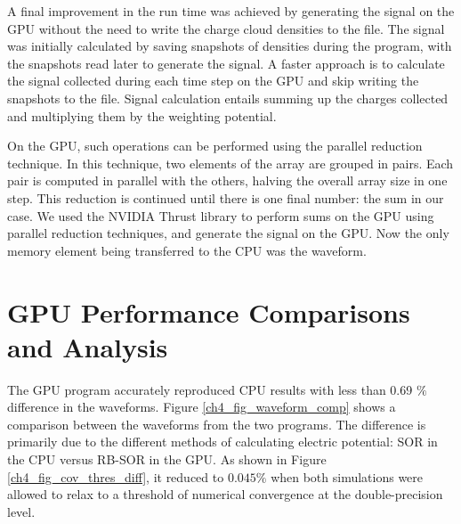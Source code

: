 A final improvement in the run time was achieved by generating the signal on the GPU without the need to write the charge cloud densities to the file. The signal was initially calculated by saving snapshots of densities during the program, with the snapshots read later to generate the signal. A faster approach is to calculate the signal collected during each time step on the GPU and skip writing the snapshots to the file. Signal calculation entails summing up the charges collected and multiplying them by the weighting potential. 



On the GPU, such operations can be performed using the parallel reduction technique. In this technique, two elements of the array are grouped in pairs. Each pair is computed in parallel with the others, halving the overall array size in one step. This reduction is continued until there is one final number: the sum in our case. We used the NVIDIA Thrust library to perform sums on the GPU using parallel reduction techniques, and generate the signal on the GPU. Now the only memory element being transferred to the CPU was the waveform.

\section{GPU Performance Comparisons and Analysis}

The GPU program accurately reproduced CPU results with less than 0.69 $\%$ difference in the waveforms. Figure \ref{ch4_fig_waveform_comp} shows a comparison between the waveforms from the two programs. The difference is primarily due to the different methods of calculating electric potential: SOR in the CPU versus RB-SOR in the GPU. As shown in Figure \ref{ch4_fig_cov_thres_diff}, it reduced to $0.045\%$ when both simulations were allowed to relax to a threshold of numerical convergence at the double-precision level.

